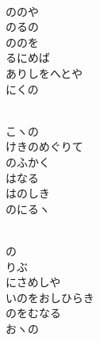 \documentclass[10pt,b5j]{tarticle} %
\begin{document}
\begin{enumerate}
\begin{minipage}[c]{\blocksize}
    \end{minipage}
    \begin{minipage}[c]{\blocksize}
        
        \vspace{\linespace}
        \item~\\
        ののや\\
        のるの\\
        ののを\\
        るにめば\\
        ありしをへとや\\
        にくの
        
    \end{minipage}
    \begin{minipage}[c]{\blocksize}
        
        \vspace{\linespace}
        \item~\\
        こヽの\\
        けきのめぐりて\\
        のふかく\\
        はなる\\
        はのしき\\
        のにるヽ
        
    \end{minipage}
    \begin{minipage}[c]{\blocksize}
        
        \vspace{\linespace}
        \item~\\
        の\\
        りぶ\\
        にさめしや\\
        いのをおしひらき\\
        のをむなる\\
        おヽの
        

\end{minipage}
\end{enumerate}
\end{document}
